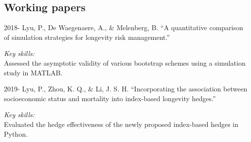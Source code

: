 \documentclass[12pt,letterpaper]{report}
\begin{document}
%
%
    \subsection*{Working papers}

    \begin{tablist}
        
        \item[2018-] \tab Lyu, P., De Waegenaere, A., \& Melenberg, B. \enquote{A quantitative comparison of simulation strategies for longevity risk management.} 
        
        \medskip
        
        \textit{Key skills:}\\
		Assessed the asymptotic validity of various bootstrap schemes using a simulation study in MATLAB.
        
        \item[2019-] \tab Lyu, P., Zhou, K. Q., \& Li, J. S. H. \enquote{Incorporating the association between socioeconomic status and mortality into index-based longevity hedges.}
        
        \medskip
        
        \textit{Key skills:}\\
       	Evaluated the hedge effectiveness of the newly proposed index-based hedges in Python.
        
%        
%        

    \end{tablist}
\end{document}
